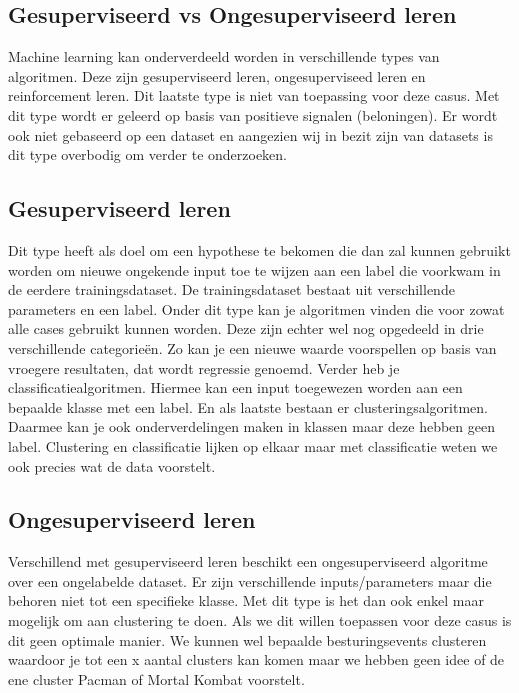 \subsection{Gesuperviseerd vs Ongesuperviseerd leren}
\label{sec: superviseerd-vs-ongesuperviseerd-leren}
Machine learning kan onderverdeeld worden in verschillende types van algoritmen. Deze zijn gesuperviseerd leren, ongesuperviseed leren en reinforcement leren. Dit laatste type is niet van toepassing voor deze casus. Met dit type wordt er geleerd op basis van positieve signalen (beloningen). Er wordt ook niet gebaseerd op een dataset en aangezien wij in bezit zijn van datasets is dit type overbodig om verder te onderzoeken. 

\subsection*{Gesuperviseerd leren}
\label{sec: superviseerd-leren}
Dit type heeft als doel om een hypothese te bekomen die dan zal kunnen gebruikt worden om nieuwe ongekende input toe te wijzen aan een label die voorkwam in de eerdere trainingsdataset. De trainingsdataset bestaat uit verschillende parameters en een label. Onder dit type kan je algoritmen vinden die voor zowat alle cases gebruikt kunnen worden. Deze zijn echter wel nog opgedeeld in drie verschillende categorieën. Zo kan je een nieuwe waarde voorspellen op basis van vroegere resultaten, dat wordt regressie genoemd. Verder heb je classificatiealgoritmen. Hiermee kan een input toegewezen worden aan een bepaalde klasse met een label. En als laatste bestaan er clusteringsalgoritmen. Daarmee kan je ook onderverdelingen maken in klassen maar deze hebben geen label. Clustering en classificatie lijken op elkaar maar met classificatie weten we ook precies wat de data voorstelt. 

\subsection*{Ongesuperviseerd leren}
\label{sec: ongesuperviseerd-leren}
Verschillend met gesuperviseerd leren beschikt een ongesuperviseerd algoritme over een ongelabelde dataset. Er zijn verschillende inputs/parameters maar die behoren niet tot een specifieke klasse. Met dit type is het dan ook enkel maar mogelijk om aan clustering te doen. Als we dit willen toepassen voor deze casus is dit geen optimale manier. We kunnen wel bepaalde besturingsevents clusteren waardoor je tot een x aantal clusters kan komen maar we hebben geen idee of de ene cluster Pacman of Mortal Kombat voorstelt. 


